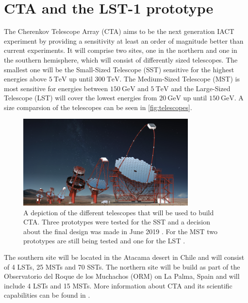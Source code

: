 \section{CTA and the LST-1 prototype}
The Cherenkov Telescope Array (CTA) aims to be the next generation IACT experiment by providing a sensitivity at least an order of magnitude better than current experiments.
It will comprise two sites, one in the northern and one in the southern hemisphere, which will consist of differently sized telescopes. 
The smallest one will be the Small-Sized Telescope (SST) sensitive for the highest energies above $\SI{5}{\tera\electronvolt}$ up until $\SI{300}{\tera\electronvolt}$.
The Medium-Sized Telescope (MST) is most sensitive for energies between $\SI{150}{\giga\electronvolt}$ and $\SI{5}{\tera\electronvolt}$ and the 
Large-Sized Telescope (LST) will cover the lowest energies from $\SI{20}{\giga\electronvolt}$ up until $\SI{150}{\giga\electronvolt}$.
A size comparsion of the telescopes can be seen in \autoref{fig:telescopes}.
\begin{figure}
    \centering
    \includegraphics[width=0.8\textwidth]{images/CTA_telescopes.png}
    \caption{A depiction of the different telescopes that will be used to build CTA. 
        Three prototypes were tested for the SST and a decision about the final design was made in June 2019 \cite{sst_decision}.
        For the MST two prototypes are still being tested and one for the LST \cite{cta-website}.
    }
    \label{fig:telescopes}
\end{figure}

The southern site will be located in the Atacama desert in Chile and will consist of \num{4} LSTs, \num{25} MSTs and \num{70} SSTs.
The northern site will be build as part of the Observatorio del Roque de los Muchachos (ORM) on La Palma, Spain and will include \num{4} LSTs and \num{15} MSTs.
More information about CTA and its scientific capabilities can be found in \cite{science_with_cta}.

